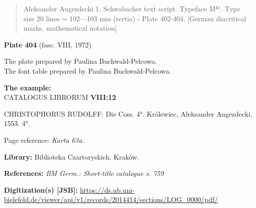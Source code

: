 \documentclass[12pt]{article}
\newcommand{\pismoEN}[1]{{\relsize{1}\Junicode\begin{quote}#1\end{quote}}}
\newcommand{\plate}[3]{\textbf{Plate #1} (fasc. #2, #3)}
\newcommand{\exampleBib}[1]{{\relsize{2}\Junicode\textbf{The
      example:}\\[2ex] CATALOGUS LIBRORUM \textbf{#1}}}
\newcommand{\exampleDesc}[1]{{\relsize{0}\Junicode#1}}
\newcommand{\exampleDig}[1]{{\relsize{0}\Junicode \textbf{Digitization(s) [JSB]:} #1}}
\newcommand{\exampleLib}[1]{{\relsize{0}\Junicode \textbf{Library:} #1}}
\newcommand{\examplePL}[1]{}
\newcommand{\exampleEN}[1]{}
\newcommand{\exampleRef}[1]{{\relsize{0}\Junicode \textbf{References:} #1}}
\newcommand{\examplePage}[1]{{Page reference: \relsize{0}\Junicode#1}}
\begin{document}
  \pismoEN{Aleksander Augezdecki 1. Schwabacher text script. Typeface
    M⁸¹. Type size 20 lines = 102—103 mm (tertia) - Plate
    402-404. [German diacritical marks, mathematical notation]}

\medskip

\plate{404}{VIII}{1972}

The plate    prepared by Paulina Buchwald-Pelcowa.\\
The font table    prepared by Paulina Buchwald-Pelcowa.\\

\bigskip

\exampleBib{VIII:12}

\bigskip
\exampleDesc{CHRISTOPHORUS RUDOLFF: Die Coss. 4°. Królewiec, Aleksander Augezdecki, 1553. 4°.}

\medskip
\examplePage{\textit{Karta 63a.}}

  \bigskip
\exampleLib{Biblioteka Czartoryskich. Kraków.}

\bigskip
\exampleRef{\textit{BM Germ.: Short-title catalogue s. 759}}

\bigskip
\exampleDig{\url{https://ds.ub.uni-bielefeld.de/viewer/api/v1/records/2014414/sections/LOG_0000/pdf/}}

\medskip

    \examplePL{Pismo 1: tekst i zestaw liter ze znakami diakrytycznymi niemieckimi.}

    \medskip

    \exampleEN{Font 1. The text and the table of letters with German diacritical marks [and mathematical notation]}

      \bigskip




      
\end{document}
